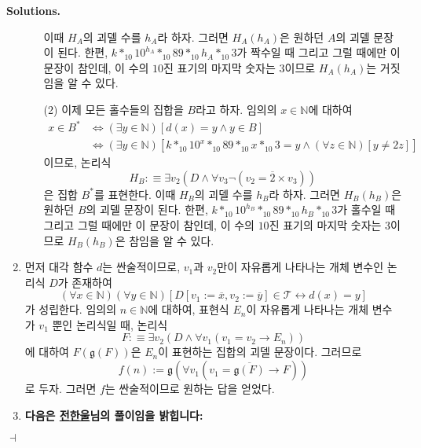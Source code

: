 \documentclass[12pt]{paper}
\newcommand{\gnum}
{ \mathfrak{g}
}
\newenvironment{context}[1][]
{ \noindent \textbf{{#1}.}
}
{ \hfill $ \dashv $
}
\begin{document}
\begin{context}[Solutions]
\begin{enumerate}
\begin{itemize}
        이때 $H_A$의 괴델 수를 $h_A$라 하자.
        그러면 $ H_A \left( h_A \right) $은 원하던 $A$의 괴델 문장이 된다.
        한편, $k *_{10} 10^{h_A} *_{10} 89 *_{10} h_A *_{10} 3$가 짝수일 때 그리고 그럴 때에만 이 문장이 참인데,
        이 수의 $10$진 표기의 마지막 숫자는 $3$이므로 $H_A \left( h_A \right)$는 거짓임을 알 수 있다.
        \item[(2)] 이제 모든 홀수들의 집합을 $B$라고 하자.
        임의의 $x \in \mathbb{N}$에 대하여
        \begin{align*}
          x \in B^{*}
          & \iff \left( \exists y \in \mathbb{N} \right) \left[ d \left( x \right) = y \land y \in B \right] \\
          & \iff \left( \exists y \in \mathbb{N} \right) \left[ k *_{10} 10^{x} *_{10} 89 *_{10} x *_{10} 3 = y \land \left( \forall z \in \mathbb{N} \right) \left[ y \neq 2 z \right] \right]
        \end{align*}
        이므로,
        논리식 $$ H_B : \equiv \exists v_2 \left( D \land \forall v_3 \lnot \left( v_2 = \overline{2} \times v_3 \right) \right) $$은 집합 $B^{*}$를 표현한다.
        이때 $H_B$의 괴델 수를 $h_B$라 하자.
        그러면 $H_B \left( h_B \right)$은 원하던 $B$의 괴델 문장이 된다.
        한편, $k *_{10} 10^{h_B} *_{10} 89 *_{10} h_B *_{10} 3$가 홀수일 때 그리고 그럴 때에만 이 문장이 참인데,
        이 수의 $10$진 표기의 마지막 숫자는 $3$이므로 $H_B \left( h_B \right)$은 참임을 알 수 있다.
      \end{itemize}

      \item 먼저 대각 함수 $d$는 싼술적이므로,
      $v_1$과 $v_2$만이 자유롭게 나타나는 개체 변수인 논리식 $D$가 존재하여
      $$\left( \forall x \in \mathbb{N} \right) \left( \forall y \in \mathbb{N} \right) \left[ D \left[ v_1 := \overline{x} , v_2 := \overline{y} \right] \in \mathcal{T} \leftrightarrow d \left( x \right) = y \right]$$가 성립한다.
      임의의 $n \in \mathbb{N}$에 대하여,
      표현식 $E_{n}$이 자유롭게 나타나는 개체 변수가 $v_1$ 뿐인 논리식일 때,
      논리식 $$ F : \equiv \exists v_2 \left( D \land \forall v_1 \left( v_1 = v_2 \rightarrow E_{n} \right) \right) $$에 대하여
      $F \left( \gnum \left( F \right) \right)$은 $E_{n}$이 표현하는 집합의 괴델 문장이다.
      그러므로 $$ f \left( n \right) := \gnum \left( \forall v_1 \left( v_1 = \overline{\gnum \left( F \right)} \rightarrow F \right) \right) $$로 두자.
      그러면 $f$는 싼술적이므로 원하는 답을 얻었다.

      \item \textbf{다음은 \underline{전한울}님의 풀이임을 밝힙니다:}


\end{enumerate}
\end{context}
\end{document}
